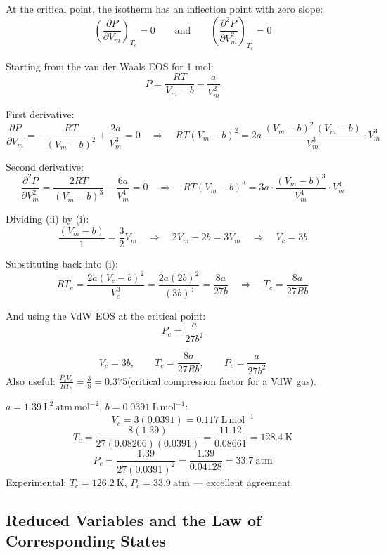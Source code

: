 \documentclass[12pt,a4paper]{article}
\begin{document}
\begin{tcolorbox}[formulabox, title={Conditions at the Critical Point}]
At the critical point, the isotherm has an inflection point with zero slope:
\[
\left(\frac{\partial P}{\partial V_m}\right)_{T_c} = 0
\qquad\text{and}\qquad
\left(\frac{\partial^2 P}{\partial V_m^2}\right)_{T_c} = 0
\]
\end{tcolorbox}

Starting from the van der Waals EOS for 1 mol:
\[
P = \frac{RT}{V_m - b} - \frac{a}{V_m^2}
\]

First derivative:
\[
\frac{\partial P}{\partial V_m} = -\frac{RT}{(V_m-b)^2} + \frac{2a}{V_m^3} = 0
\quad\Rightarrow\quad RT(V_m-b)^2 = 2a\,\frac{(V_m-b)^2\,(V_m-b)}{V_m^3}\cdot V_m^3 \tag{i}
\]

Second derivative:
\[
\frac{\partial^2 P}{\partial V_m^2} = \frac{2RT}{(V_m-b)^3} - \frac{6a}{V_m^4} = 0
\quad\Rightarrow\quad RT(V_m-b)^3 = 3a\cdot\frac{(V_m-b)^3}{V_m^4}\cdot V_m^4 \tag{ii}
\]

Dividing (ii) by (i):
\[
\frac{(V_m-b)}{1} = \frac{3}{2}V_m \quad\Rightarrow\quad 2V_m - 2b = 3V_m \quad\Rightarrow\quad \boxed{V_c = 3b}
\]

Substituting back into (i):
\[
RT_c = \frac{2a(V_c-b)^2}{V_c^3} = \frac{2a(2b)^2}{(3b)^3} = \frac{8a}{27b}
\quad\Rightarrow\quad \boxed{T_c = \frac{8a}{27Rb}}
\]

And using the VdW EOS at the critical point:
\[
\boxed{P_c = \frac{a}{27b^2}}
\]

\begin{tcolorbox}[formulabox, title={Critical Constants (Van der Waals)}]
\[
V_c = 3b, \qquad T_c = \frac{8a}{27Rb}, \qquad P_c = \frac{a}{27b^2}
\]
Also useful: $\displaystyle\frac{P_c V_c}{RT_c} = \frac{3}{8} = 0.375$\quad (critical compression factor for a VdW gas).
\end{tcolorbox}

\begin{tcolorbox}[examplebox, title={Solved Example: Critical Constants of \texorpdfstring{$\mathrm{N_2}$}{N2}}]
$a=1.39\ \mathrm{L^2\,atm\,mol^{-2}}$, $b=0.0391\ \mathrm{L\,mol^{-1}}$:
\[
V_c = 3(0.0391) = 0.117\ \mathrm{L\,mol^{-1}}
\]
\[
T_c = \frac{8(1.39)}{27(0.08206)(0.0391)} = \frac{11.12}{0.08661} = 128.4\ \mathrm{K}
\]
\[
P_c = \frac{1.39}{27(0.0391)^2} = \frac{1.39}{0.04128} = 33.7\ \mathrm{atm}
\]
Experimental: $T_c=126.2\ \mathrm{K}$, $P_c=33.9\ \mathrm{atm}$ --- excellent agreement.
\end{tcolorbox}

\subsection{Reduced Variables and the Law of Corresponding States}
\end{document}
